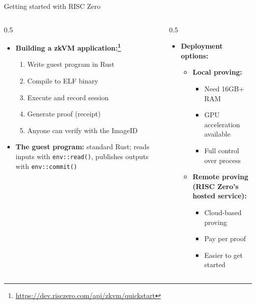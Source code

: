 \ifdefined\PRESENTATION\else\PassOptionsToClass{handout}{beamer}\fi\documentclass[aspectratio=169, lualatex]{beamer}
\begin{document}
\begin{frame}{Getting started with RISC Zero}
	\begin{columns}[c]
		\begin{column}{0.5\textwidth}
			\begin{itemize}
				\item \textbf{Building a zkVM application:\footnote{\url{https://dev.risczero.com/api/zkvm/quickstart}}}
				      \begin{enumerate}
					      \item Write guest program in Rust
					      \item Compile to ELF binary
					      \item Execute and record session
					      \item Generate proof (receipt)
					      \item Anyone can verify with the ImageID
				      \end{enumerate}
				\item \textbf{The guest program:} standard Rust; reads inputs with \texttt{env::read()}, publishes outputs with \texttt{env::commit()}
			\end{itemize}
		\end{column}
		\begin{column}{0.5\textwidth}
			\begin{itemize}
				\item \textbf{Deployment options:}
				      \begin{itemize}
					      \item \textbf{Local proving:}
					            \begin{itemize}
						            \item Need 16GB+ RAM
						            \item GPU acceleration available
						            \item Full control over process
					            \end{itemize}
					      \item \textbf{Remote proving (RISC Zero's hosted service):}
					            \begin{itemize}
						            \item Cloud-based proving
						            \item Pay per proof
						            \item Easier to get started
					            \end{itemize}
				      \end{itemize}
			\end{itemize}
		\end{column}
	\end{columns}
\end{frame}
\end{document}
